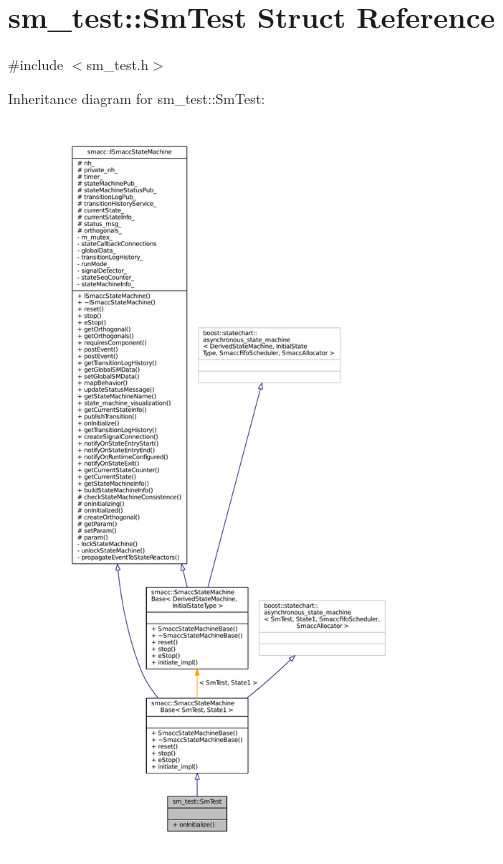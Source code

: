\hypertarget{structsm__test_1_1SmTest}{}\section{sm\+\_\+test\+:\+:Sm\+Test Struct Reference}
\label{structsm__test_1_1SmTest}


{\ttfamily \#include $<$sm\+\_\+test.\+h$>$}



Inheritance diagram for sm\+\_\+test\+:\+:Sm\+Test\+:
\nopagebreak
\begin{figure}[H]
\begin{center}
\leavevmode
\includegraphics[height=550pt]{structsm__test_1_1SmTest__inherit__graph}
\end{center}
\end{figure}


